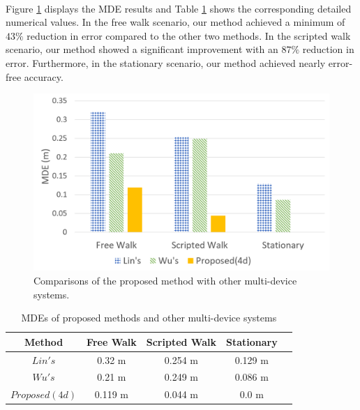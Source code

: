 \documentclass[a4paper,12pt]{report}
\begin{document}
\paragraph{}
Figure \ref{Fig:mde_multidevice} displays the MDE results and Table \ref{table:5_2_MDEs} shows the corresponding detailed numerical values. In the free walk scenario, our method achieved a minimum of $43\%$ reduction in error compared to the other two methods. In the scripted walk scenario, our method showed a significant improvement with an $87\%$ reduction in error. Furthermore, in the stationary scenario, our method achieved nearly error-free accuracy.
\begin{figure}[h]
    \centering
    \includegraphics[width=0.8\columnwidth]{images/chap5-2/MDE_5-2.png}
    \caption{Comparisons of the proposed method with other multi-device systems.}
    \label{Fig:mde_multidevice}
\end{figure}
\begin{table}[htbp]
    \begin{center}
    \caption{MDEs of proposed methods and other multi-device systems}
    \label{table:5_2_MDEs}
        \begin{tabular}{|c||c|c|c|c|}
            \hline
                Method & Free Walk & Scripted Walk & Stationary \\
            \hline
            \hline
                $Lin's$ & 0.32 m  & 0.254 m  & 0.129 m \\
            \hline
                $Wu's$   & 0.21 m  & 0.249 m  & 0.086 m \\
            \hline
                $Proposed(4d)$    & 0.119 m & 0.044 m & 0.0 m \\
            \hline
        \end{tabular}
    \end{center}
\end{table}
\end{document}
